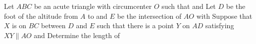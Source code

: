 Let $ABC$ be an acute triangle with circumcenter $O$ such that   and   Let $D$ be the foot of the altitude from $A$ to  and $E$ be the intersection of $AO$ with   Suppose that $X$ is on $BC$ between $D$ and $E$ such that there is a point $Y$ on $AD$ satisfying $XY\parallel AO$ and   Determine the length of 